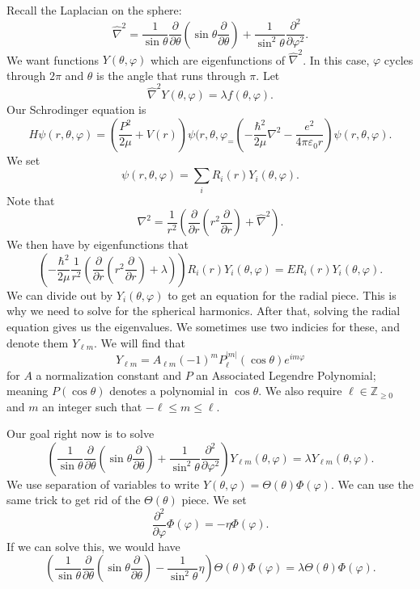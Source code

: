 Recall the Laplacian on the sphere:
\[
	\hat{\nabla }^2=\frac{1}{\sin \theta } \frac{\partial }{\partial \theta } \left( \sin \theta \frac{\partial }{\partial \theta }  \right) +\frac{1}{\sin ^2\theta } \frac{\partial ^2}{\partial \varphi  ^2} 
.\]
We want functions $Y(\theta ,\varphi )$ which are eigenfunctions of $\hat{\nabla }^2$. In this case, $\varphi $ cycles through $2\pi $ and $\theta $ is the angle that runs through $\pi $. Let
\[
	\hat{\nabla }^2 Y(\theta ,\varphi )=\lambda f(\theta ,\varphi )
.\]
Our Schrodinger equation is
\[
	H\psi (r,\theta ,\varphi )=\left(\frac{P^2}{2\mu } +V(r)\right)\psi (r,\theta ,\varphi _=\left(-\frac{\hbar ^2}{2\mu } \nabla ^2-\frac{e^2}{4\pi \varepsilon _0r} \right)\psi (r,\theta ,\varphi )
.\]
We set
\[
	\psi (r,\theta ,\varphi )=\sum_{i} R_i(r)Y_i(\theta ,\varphi )
.\]
Note that
\[
	\nabla ^2=\frac{1}{r^2} \left( \frac{\partial }{\partial r} \left( r^2 \frac{\partial }{\partial r}  \right) +\hat{\nabla }^2 \right) 
.\]
We then have by eigenfunctions that
\[
	\left( -\frac{\hbar ^2}{2\mu } \frac{1}{r^2} \left( \frac{\partial }{\partial r} \left( r^2 \frac{\partial }{\partial r}  \right) +\lambda  \right)  \right) R_i(r)Y_i(\theta ,\varphi )=ER_i(r)Y_i(\theta ,\varphi )
.\]
We can divide out by $Y_i(\theta ,\varphi )$ to get an equation for the radial piece. This is why we need to solve for the spherical harmonics. After that, solving the radial equation gives us the eigenvalues. We sometimes use two indicies for these, and denote them $Y_{\ell m} $. We will find that
\[
	Y_{\ell m} =A_{\ell m} (-1)^mP_{\ell }^{\left| m \right| } (\cos \theta )e^{im \varphi } 
\]
for $A$ a normalization constant and $P$ an Associated Legendre Polynomial; meaning $P(\cos \theta )$ denotes a polynomial in $\cos \theta $. We also require $\ell \in\mathbb{Z}_{\geq 0}  $ and $m$ an integer such that $-\ell \leq m\leq \ell $.

Our goal right now is to solve
\[
	\left( \frac{1}{\sin \theta } \frac{\partial }{\partial \theta } \left( \sin \theta \frac{\partial }{\partial \theta }  \right) +\frac{1}{\sin ^2\theta } \frac{\partial ^2}{\partial \varphi ^2}  \right) Y_{\ell m} (\theta ,\varphi )=\lambda Y_{\ell m} (\theta ,\varphi )
.\]
We use separation of variables to write $Y(\theta ,\varphi )=\Theta (\theta )\Phi (\varphi )$. We can use the same trick to get rid of the $\Theta (\theta )$ piece. We set
\[
	\frac{\partial ^2}{\partial \varphi } \Phi (\varphi )=-\eta \Phi (\varphi )
.\]
If we can solve this, we would have
\[
	\left( \frac{1}{\sin \theta } \frac{\partial }{\partial \theta } \left( \sin \theta \frac{\partial }{\partial \theta }  \right) -\frac{1}{\sin ^2\theta } \eta   \right) \Theta (\theta )\Phi (\varphi ) =\lambda \Theta (\theta )\Phi (\varphi )
.\]

